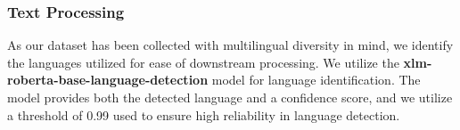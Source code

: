 
\subsubsection{Text Processing}
As our dataset has been collected with multilingual diversity in mind, we identify the languages utilized for ease of downstream processing. We utilize the \textbf{xlm-roberta-base-language-detection} model \cite{conneau2019unsupervised} for language identification. The model provides both the detected language and a confidence score, and we utilize a threshold of 0.99 used to ensure high reliability in language detection.

